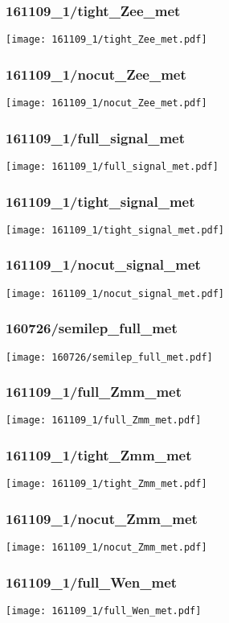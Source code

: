 \begin{frame}
   \frametitle{\small 161109\_1/tight\_Zee\_met}
   \centering
   \texttt{[image: 161109\_1/tight\_Zee\_met.pdf]}
\end{frame}

\begin{frame}
   \frametitle{\small 161109\_1/nocut\_Zee\_met}
   \centering
   \texttt{[image: 161109\_1/nocut\_Zee\_met.pdf]}
\end{frame}

\begin{frame}
   \frametitle{\small 161109\_1/full\_signal\_met}
   \centering
   \texttt{[image: 161109\_1/full\_signal\_met.pdf]}
\end{frame}

\begin{frame}
   \frametitle{\small 161109\_1/tight\_signal\_met}
   \centering
   \texttt{[image: 161109\_1/tight\_signal\_met.pdf]}
\end{frame}

\begin{frame}
   \frametitle{\small 161109\_1/nocut\_signal\_met}
   \centering
   \texttt{[image: 161109\_1/nocut\_signal\_met.pdf]}
\end{frame}

\begin{frame}
   \frametitle{\small 160726/semilep\_full\_met}
   \centering
   \texttt{[image: 160726/semilep\_full\_met.pdf]}
\end{frame}

\begin{frame}
   \frametitle{\small 161109\_1/full\_Zmm\_met}
   \centering
   \texttt{[image: 161109\_1/full\_Zmm\_met.pdf]}
\end{frame}

\begin{frame}
   \frametitle{\small 161109\_1/tight\_Zmm\_met}
   \centering
   \texttt{[image: 161109\_1/tight\_Zmm\_met.pdf]}
\end{frame}

\begin{frame}
   \frametitle{\small 161109\_1/nocut\_Zmm\_met}
   \centering
   \texttt{[image: 161109\_1/nocut\_Zmm\_met.pdf]}
\end{frame}

\begin{frame}
   \frametitle{\small 161109\_1/full\_Wen\_met}
   \centering
   \texttt{[image: 161109\_1/full\_Wen\_met.pdf]}
\end{frame}

